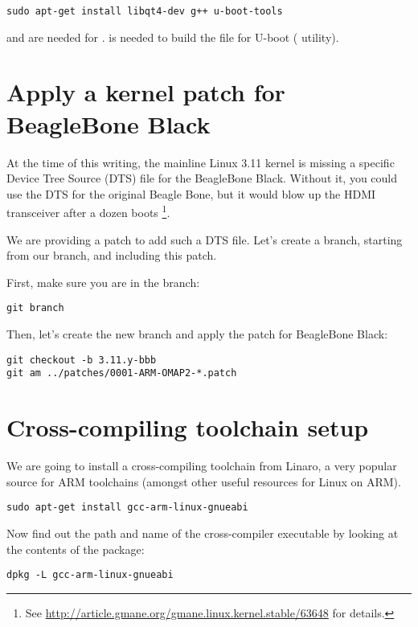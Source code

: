 \begin{verbatim}
sudo apt-get install libqt4-dev g++ u-boot-tools
\end{verbatim}

 and  are needed for .
 is needed to build the  file for
U-boot ( utility).

\section{Apply a kernel patch for BeagleBone Black}

At the time of this writing, the mainline Linux 3.11 kernel is missing a 
specific Device Tree Source (DTS) file for the BeagleBone Black.
Without it, you could use the DTS for the original Beagle Bone, but it
would blow up the HDMI transceiver after a dozen boots \footnote{See
\url{http://article.gmane.org/gmane.linux.kernel.stable/63648} for
details.}. 

We are providing a patch to add such a DTS file. Let's create 
a branch, starting from our  branch, and including this
patch.

First, make sure you are in the  branch:
\begin{verbatim}
git branch
\end{verbatim}

Then, let's create the new branch and apply the patch for BeagleBone
Black:
\begin{verbatim}
git checkout -b 3.11.y-bbb
git am ../patches/0001-ARM-OMAP2-*.patch
\end{verbatim}
 
\section{Cross-compiling toolchain setup}

We are going to install a cross-compiling toolchain from Linaro, a
very popular source for ARM toolchains (amongst other useful resources
for Linux on ARM).

\begin{verbatim}
sudo apt-get install gcc-arm-linux-gnueabi
\end{verbatim}

Now find out the path and name of the cross-compiler executable by looking at the contents of the package:

\begin{verbatim}
dpkg -L gcc-arm-linux-gnueabi
\end{verbatim}

